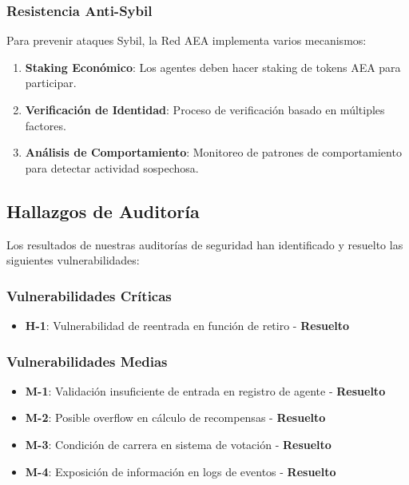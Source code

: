 \documentclass[12pt,a4paper]{article}
\begin{document}
\subsubsection{Resistencia Anti-Sybil}

Para prevenir ataques Sybil, la Red AEA implementa varios mecanismos:

\begin{enumerate}
\item \textbf{Staking Económico}: Los agentes deben hacer staking de tokens AEA para participar.
\item \textbf{Verificación de Identidad}: Proceso de verificación basado en múltiples factores.
\item \textbf{Análisis de Comportamiento}: Monitoreo de patrones de comportamiento para detectar actividad sospechosa.
\end{enumerate}

\subsection{Hallazgos de Auditoría}

Los resultados de nuestras auditorías de seguridad han identificado y resuelto las siguientes vulnerabilidades:

\subsubsection{Vulnerabilidades Críticas}
\begin{itemize}
\item \textbf{H-1}: Vulnerabilidad de reentrada en función de retiro - \textbf{Resuelto}
\end{itemize}

\subsubsection{Vulnerabilidades Medias}
\begin{itemize}
\item \textbf{M-1}: Validación insuficiente de entrada en registro de agente - \textbf{Resuelto}
\item \textbf{M-2}: Posible overflow en cálculo de recompensas - \textbf{Resuelto}
\item \textbf{M-3}: Condición de carrera en sistema de votación - \textbf{Resuelto}
\item \textbf{M-4}: Exposición de información en logs de eventos - \textbf{Resuelto}
\end{itemize}
\end{document}
